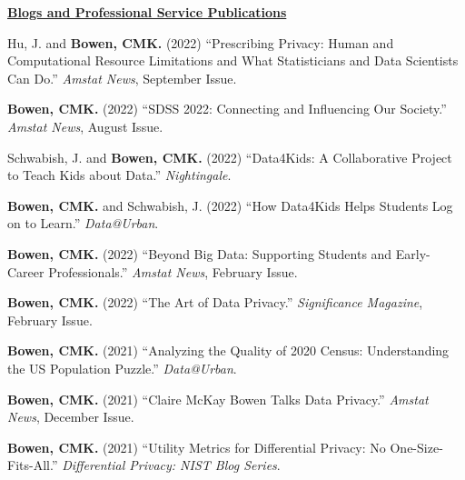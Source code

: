 \documentclass[11pt, letterpaper, roman]{moderncv} %
\begin{document}
\vspace{6pt}
\noindent\underline{\textbf{Blogs and Professional Service Publications}}
\vspace{4pt}
\begin{etaremune}[topsep=0pt, itemsep=4pt, partopsep=0pt, parsep=0pt]
    
    \item Hu, J. and \textbf{Bowen, CMK.} (2022) ``Prescribing Privacy: Human and Computational Resource Limitations and What Statisticians and Data Scientists Can Do.'' \textit{Amstat News}, September Issue.
    
    \item \textbf{Bowen, CMK.} (2022) ``SDSS 2022: Connecting and Influencing Our Society.'' \textit{Amstat News}, August Issue.
    
    \item Schwabish, J. and \textbf{Bowen, CMK.} (2022) ``Data4Kids: A Collaborative Project to Teach Kids about Data.'' \textit{Nightingale}.
    
    \item \textbf{Bowen, CMK.} and Schwabish, J. (2022) ``How Data4Kids Helps Students Log on to Learn.'' \textit{Data@Urban}.

    \item \textbf{Bowen, CMK.} (2022) ``Beyond Big Data: Supporting Students and Early-Career Professionals.'' \textit{Amstat News}, February Issue.
    
    \item \textbf{Bowen, CMK.} (2022) ``The Art of Data Privacy.'' \textit{Significance Magazine}, February Issue.
    
    \item \textbf{Bowen, CMK.} (2021) ``Analyzing the Quality of 2020 Census: Understanding the US Population Puzzle.'' \textit{Data@Urban}.

    \item \textbf{Bowen, CMK.} (2021) ``Claire McKay Bowen Talks Data Privacy.'' \textit{Amstat News}, December Issue.
    
    \item \textbf{Bowen, CMK.} (2021) ``Utility Metrics for Differential Privacy: No One-Size-Fits-All.'' \textit{Differential Privacy: NIST Blog Series}.
    

\end{etaremune}
\end{document}
